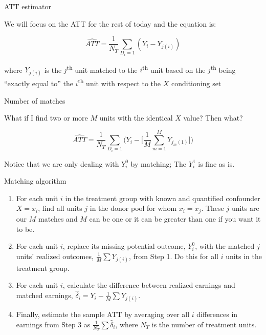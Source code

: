\documentclass{beamer}
\begin{document}
\begin{frame}{ATT estimator}

We will focus on the ATT for the rest of today and the equation is:

\begin{equation}
\widehat{ATT} = \dfrac{1}{N_T} \sum_{D_i=1}(Y_i - Y_{j(i)})
\label{eq:att_simplematch}
\end{equation}

where $Y_{j(i)}$ is the $j$\textsuperscript{th} unit matched to the $i$\textsuperscript{th} unit based on the $j$\textsuperscript{th} being ``exactly equal to'' the $i$\textsuperscript{th} unit with respect to the $X$ conditioning set

\end{frame}

\begin{frame}{Number of matches}

What if I find two or more $M$ units with the identical $X$ value? Then what?

\begin{equation}
\widehat{ATT} = \dfrac{1}{N_T} \sum_{D_i=1} \bigg ( Y_i - \bigg [\dfrac{1}{M} \sum_{m=1}^M Y_{j_m(1)} \bigg ] \bigg )
\label{eq:att_match}
\end{equation}

\bigskip

Notice that we are only dealing with $Y^0_i$ by matching; The $Y^1_i$ is fine as is.

\end{frame}

\begin{frame}{Matching algorithm}

\begin{enumerate}
\item For each unit $i$ in the treatment group with known and quantified confounder $X=x_i$, find all units $j$ in the donor pool for whom $x_i=x_j$. These $j$ units are our $M$ matches and $M$ can be one or it can be greater than one if you want it to be.
\item For each unit $i$, replace its missing potential outcome, $Y^0_i$, with the matched $j$ units' realized outcomes, $\frac{1}{M} \sum {Y}_{j(i)}$, from Step 1. Do this for all $i$ units in the treatment group.
\item For each unit $i$, calculate the difference between realized earnings and matched earnings, $\widehat{\delta}_i=Y_i - \frac{1}{M} \sum {Y}_{j(i)}$.
\item Finally, estimate the sample ATT by averaging over all $i$ differences in earnings from Step 3 as $\frac{1}{N_T} \sum \widehat{\delta}_i$, where $N_T$ is the number of treatment units.
\end{enumerate}

\end{frame}
\end{document}

